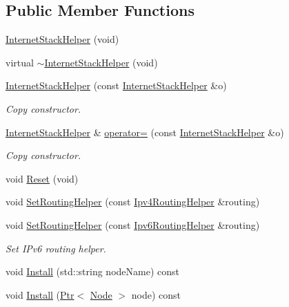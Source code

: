 \subsection*{Public Member Functions}
\begin{DoxyCompactItemize}
\item 
\hyperlink{classns3_1_1InternetStackHelper_aabbcc90f3210ac2a636ba6bb814044a6}{Internet\+Stack\+Helper} (void)
\item 
virtual \hyperlink{classns3_1_1InternetStackHelper_ad61c4845f886b09233ddab021873d303}{$\sim$\+Internet\+Stack\+Helper} (void)
\item 
\hyperlink{classns3_1_1InternetStackHelper_a97777d2bdd2c8616cee38a2808231aab}{Internet\+Stack\+Helper} (const \hyperlink{classns3_1_1InternetStackHelper}{Internet\+Stack\+Helper} \&o)
\begin{DoxyCompactList}\small\item\em Copy constructor. \end{DoxyCompactList}\item 
\hyperlink{classns3_1_1InternetStackHelper}{Internet\+Stack\+Helper} \& \hyperlink{classns3_1_1InternetStackHelper_abcbbffe4bb2c8dcfb8ffc495c5ebaba9}{operator=} (const \hyperlink{classns3_1_1InternetStackHelper}{Internet\+Stack\+Helper} \&o)
\begin{DoxyCompactList}\small\item\em Copy constructor. \end{DoxyCompactList}\item 
void \hyperlink{classns3_1_1InternetStackHelper_a2c9c2074c78e3914eb4760fb1e222d49}{Reset} (void)
\item 
void \hyperlink{classns3_1_1InternetStackHelper_a3e382c02df022dec79952a7eca8cd5ba}{Set\+Routing\+Helper} (const \hyperlink{classns3_1_1Ipv4RoutingHelper}{Ipv4\+Routing\+Helper} \&routing)
\item 
void \hyperlink{classns3_1_1InternetStackHelper_af3b2b9f74fdf4aa20317a8996564921a}{Set\+Routing\+Helper} (const \hyperlink{classns3_1_1Ipv6RoutingHelper}{Ipv6\+Routing\+Helper} \&routing)
\begin{DoxyCompactList}\small\item\em Set I\+Pv6 routing helper. \end{DoxyCompactList}\item 
void \hyperlink{classns3_1_1InternetStackHelper_a6645b412f31283d2d9bc3d8a95cebbc0}{Install} (std\+::string node\+Name) const 
\item 
void \hyperlink{classns3_1_1InternetStackHelper_a14b0da37b1617255bf1078c11a108dce}{Install} (\hyperlink{classns3_1_1Ptr}{Ptr}$<$ \hyperlink{classns3_1_1Node}{Node} $>$ node) const 

\end{DoxyCompactItemize}
